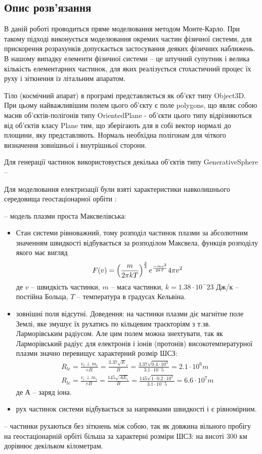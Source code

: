 \documentclass[a4paper,12pt]{article}
\begin{document}
\subsection{Опис розв’язання}
В даній роботі проводиться пряме моделювання методом Монте-Карло. При такому підході виконується моделювання окремих частин фізичної системи, для прискорення розрахунків допускається застосування деяких фізичних наближень. В нашому випадку елементи фізичної системи -- це штучний супутник і велика кількість елементарних частинок, для яких реалізується стохастичний процес їх руху і зіткнення із літальним апаратом.

Тіло (космічний апарат) в програмі представляється як об’єкт типу Object3D. При цьому найважливішим полем цього об’єкту є поле polygons, що являє собою масив об’єктів-полігонів типу OrientedPlane - об’єкти цього типу відрізняються від об’єктів класу Plane тим, що зберігають для в собі вектор нормалі до площини, яку представляють. Нормаль необхідна полігонам для чіткого визначення зовнішньої і внутрішньої сторони.

Для генерації частинок використовується декілька об’єктів типу GenerativeSphere -- 

Для моделювання електризації були взяті характеристики навколишнього середовища геостаціонарної орбіти \cite{novikov}:

-- модель плазми проста Максвелівська:
\renewcommand{\labelitemi}{$\circ$}
\begin{itemize}
 \item Стан системи рівноважний, тому розподіл частинок плазми за абсолютним значенням швидкості відбувається за розподілом Максвела, функція розподілу якого має вигляд
\[
  F(v) = \left(\frac{m}{2 \pi k T}\right)^{3 \over 2} e^\frac{-mv^2}{2 k T} 4 \pi v^2
\]
 де $v$ -- швидкість частинки, $m$ -- маса частинки, $k = 1.38 \cdot 10^-23$ Дж/к -- постійна Больца, $T$ -- температура в градусах Кельвіна.
 \item зовнішні поля відсутні. Доведення: на частинки плазми діє магнітне поле Землі, яке змушує їх рухатись по кільцевим траєкторіям з т.зв. Ларморівським радіусом. Але цим полем можна знехтувати, так як Ларморівський радіус для електронів і іонів (протонів) високотемпературної плазми значно перевищує характерний розмір ШСЗ:
\begin{eqnarray}
 R_{le} = \frac{v_e \perp m_e}{eB} = \frac{3.37 \sqrt E_e}{B} = \frac{3.37 \sqrt {0.4 \cdot 10^3}}{3.1 \cdot 10^-5} = 2.1 \cdot 10^6 m \\
 R_{le} = \frac{v_i \perp m_i}{eB} = \frac{145 \sqrt {A E_i}}{B} = \frac{145 \sqrt {1 \cdot 0.2 \cdot 10^3}}{3.1 \cdot 10^-5} = 6.6 \cdot 10^7 m
\end{eqnarray}
де А -- заряд іона.
 \item рух частинок системи відбувається за напрямками швидкості і є рівномірним.
\end{itemize}
-- частинки рухаються без зіткнень між собою, так як довжина вільного пробігу на геостаціонарній орбіті більша за характерні розміри ШСЗ: на висоті 300 км дорівнює декільком кілометрам.
\end{document}
